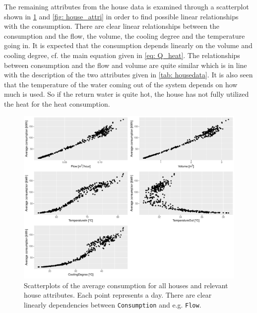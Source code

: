 \noindent The remaining attributes from the house data is examined through a scatterplot shown in \cref{fig: housepairs} and \cref{fig: house_attri} in order to find possible linear relationships with the consumption. There are clear linear relationships between the consumption and the flow, the volume, the cooling degree and the temperature going in. It is expected that the consumption depends linearly on the volume and cooling degree, cf. the main equation given in \cref{eq: Q_heat}. The relationships between consumption and the flow and volume are quite similar which is in line with the description of the two attributes given in \cref{tab: housedata}. It is also seen that the temperature of the water coming out of the system depends on how much is used. So if the return water is quite hot, 
the house has not fully utilized the heat for the heat consumption. 
\begin{figure}
    \centering
    \includegraphics[width=1.\textwidth]{../../../figures/housepairs.pdf}
    \caption{Scatterplots of the average consumption for all houses and relevant house attributes. Each point represents a day. There are clear linearly dependencies between \texttt{Consumption} and e.g. \texttt{Flow}.} 
    \label{fig: housepairs}
\end{figure}

